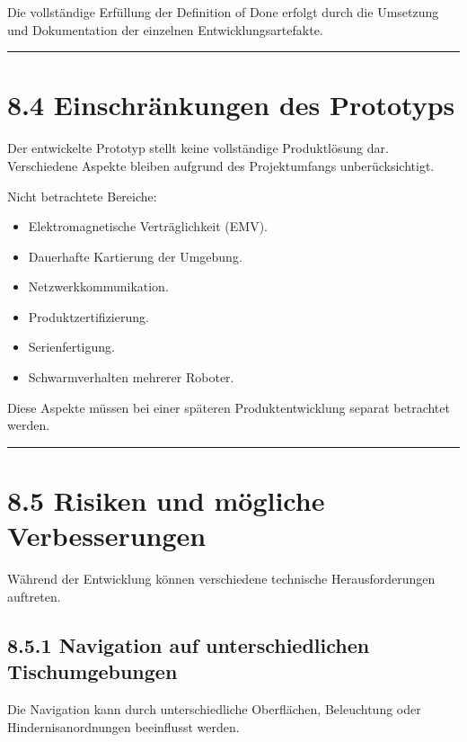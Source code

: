 \documentclass[
  a4paper,
  12pt,
  DIV=12,        %
  parskip=half,  %
  headings=small %
]{scrartcl}
\theoremstyle{definition}
\providecommand{\tightlist}{%
  \setlength{\itemsep}{0pt}\setlength{\parskip}{0pt}}
\theoremstyle{definition}
\providecommand{\tightlist}{%
  \setlength{\itemsep}{0pt}\setlength{\parskip}{0pt}}
\begin{document}
Die vollständige Erfüllung der Definition of Done erfolgt durch die
Umsetzung und Dokumentation der einzelnen Entwicklungsartefakte.

\begin{center}\rule{0.5\linewidth}{0.5pt}\end{center}

\section{8.4 Einschränkungen des
Prototyps}\label{einschruxe4nkungen-des-prototyps}

Der entwickelte Prototyp stellt keine vollständige Produktlösung dar.
Verschiedene Aspekte bleiben aufgrund des Projektumfangs
unberücksichtigt.

Nicht betrachtete Bereiche:

\begin{itemize}
\tightlist
\item
  Elektromagnetische Verträglichkeit (EMV).
\item
  Dauerhafte Kartierung der Umgebung.
\item
  Netzwerkkommunikation.
\item
  Produktzertifizierung.
\item
  Serienfertigung.
\item
  Schwarmverhalten mehrerer Roboter.
\end{itemize}

Diese Aspekte müssen bei einer späteren Produktentwicklung separat
betrachtet werden.

\begin{center}\rule{0.5\linewidth}{0.5pt}\end{center}

\section{8.5 Risiken und mögliche
Verbesserungen}\label{risiken-und-muxf6gliche-verbesserungen}

Während der Entwicklung können verschiedene technische Herausforderungen
auftreten.

\subsection{8.5.1 Navigation auf unterschiedlichen
Tischumgebungen}\label{navigation-auf-unterschiedlichen-tischumgebungen}

Die Navigation kann durch unterschiedliche Oberflächen, Beleuchtung oder
Hindernisanordnungen beeinflusst werden.
\end{document}
